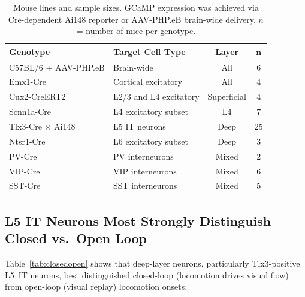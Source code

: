 \documentclass[11pt]{article}
\begin{document}
\begin{table}[H]
\centering
\caption{Mouse lines and sample sizes. GCaMP expression was achieved via Cre-dependent Ai148 reporter or AAV-PHP.eB brain-wide delivery. $n$ = number of mice per genotype.}
\label{tab:mice}
\begin{tabular}{llcc}
\toprule
\textbf{Genotype} & \textbf{Target Cell Type} & \textbf{Layer} & $\boldsymbol{n}$ \\
\midrule
C57BL/6 + AAV-PHP.eB & Brain-wide & All & 6 \\
Emx1-Cre & Cortical excitatory & All & 4 \\
Cux2-CreERT2 & L2/3 and L4 excitatory & Superficial & 4 \\
Scnn1a-Cre & L4 excitatory subset & L4 & 7 \\
Tlx3-Cre $\times$ Ai148 & L5 IT neurons & Deep & 25 \\
Ntsr1-Cre & L6 excitatory subset & Deep & 3 \\
PV-Cre & PV interneurons & Mixed & 2 \\
VIP-Cre & VIP interneurons & Mixed & 6 \\
SST-Cre & SST interneurons & Mixed & 5 \\
\bottomrule
\end{tabular}
\end{table}

\subsection{L5 IT Neurons Most Strongly Distinguish Closed vs.\ Open Loop}

Table~\ref{tab:closedopen} shows that deep-layer neurons, particularly Tlx3-positive L5~IT neurons, best distinguished closed-loop (locomotion drives visual flow) from open-loop (visual replay) locomotion onsets.
\end{document}
